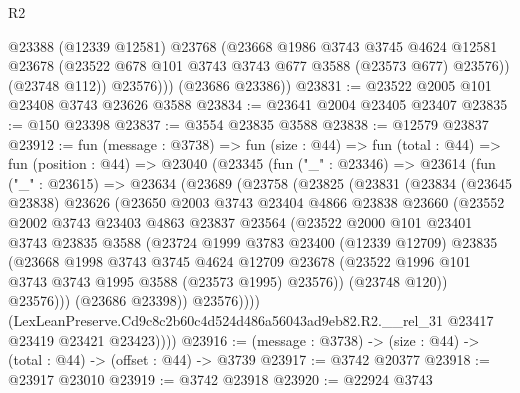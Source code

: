 \begin{lexlean}{R2}
\begin{coremodule}
              @23388
              (@12339 @12581)
              @23768
              (@23668
                @1986
                @3743
                @3745
                @4624
                @12581
                @23678
                (@23522 @678 @101 @3743 @3743 @677 @3588 (@23573 @677) @23576))
              (@23748 @112))
            @23576)))
      (@23686 @23386))
@23831 := @23522 @2005 @101 @23408 @3743 @23626 @3588
@23834 := @23641 @2004 @23405 @23407
@23835 := @150 @23398
@23837 := @3554 @23835 @3588
@23838 := @12579 @23837
@23912 := fun (message : @3738) =>
  fun (size : @44) =>
  fun (total : @44) =>
  fun (position : @44) =>
  @23040
    (@23345
      (fun ("_" : @23346) =>
      @23614
        (fun ("_" : @23615) =>
        @23634
          (@23689
            (@23758
              (@23825
                (@23831
                  (@23834
                    (@23645 @23838)
                    @23626
                    (@23650
                      @2003
                      @3743
                      @23404
                      @4866
                      @23838
                      @23660
                      (@23552
                        @2002
                        @3743
                        @23403
                        @4863
                        @23837
                        @23564
                        (@23522
                          @2000
                          @101
                          @23401
                          @3743
                          @23835
                          @3588
                          (@23724
                            @1999
                            @3783
                            @23400
                            (@12339 @12709)
                            @23835
                            (@23668
                              @1998
                              @3743
                              @3745
                              @4624
                              @12709
                              @23678
                              (@23522 @1996 @101 @3743 @3743 @1995 @3588 (@23573 @1995) @23576))
                            (@23748 @120))
                          @23576)))
                    (@23686 @23398))
                  @23576))))
          (LexLeanPreserve.Cd9c8c2b60c4d524d486a56043ad9eb82.R2.__rel_31
            @23417
            @23419
            @23421
            @23423))))
@23916 := (message : @3738) -> (size : @44) -> (total : @44) -> (offset : @44) -> @3739
@23917 := @3742 @20377
@23918 := @23917 @23010
@23919 := @3742 @23918
@23920 := @22924 @3743

\end{coremodule}
\end{lexlean}
